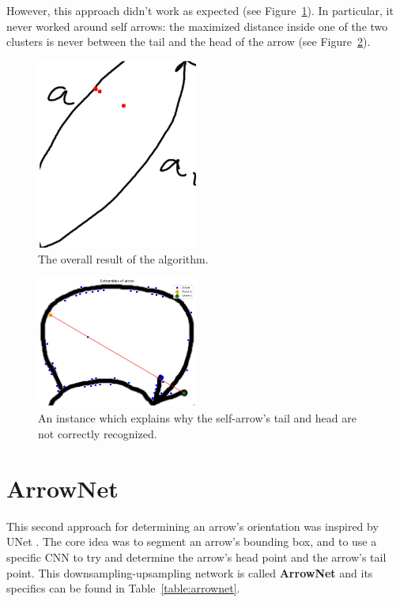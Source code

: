 \documentclass[conference]{IEEEtran}
\begin{document}
\begin{appendices}
However, this approach didn't work as expected (see Figure~\ref{fig:template_matching_fail}). In particular, it never worked around self arrows: the maximized distance inside one of the two clusters is never between the tail and the head of the arrow (see Figure~\ref{fig:selfarrowdc}).

\begin{figure}[H]
	\centering
	\includegraphics[width=150pt]{template_matching_fail.png}
	\caption{The overall result of the algorithm.}
	\label{fig:template_matching_fail}
\end{figure}

\begin{figure}[H]
	\centering
	\includegraphics[width=150pt]{selfarrowdc.jpg}
	\caption{An instance which explains why the self-arrow's tail and head are not correctly recognized.}
	\label{fig:selfarrowdc}
\end{figure}

\section{ArrowNet}
\label{arrow-net}
This second approach for determining an arrow's orientation was inspired by UNet \cite{unet}. The core idea was to segment an arrow's bounding box, and to use a specific CNN to try and determine the arrow's head point and the arrow's tail point. This downsampling-upsampling network is called \textbf{ArrowNet} and its specifics can be found in Table~\ref{table:arrownet}.


\end{appendices}
\end{document}
